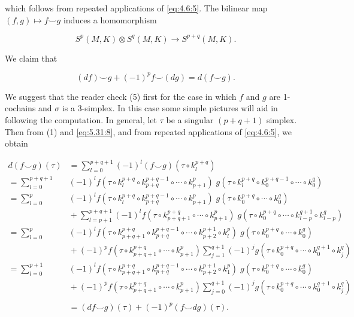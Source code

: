 which follows from repeated applications of \eqref{eq:4.6:5}. The bilinear map  $(f,g)\mapsto f\smallsmile g$ induces a homomorphism

\begin{equation}
\tag{4}\label{eq:5.44:4}
S^{p}(M,K)\otimes S^{q}(M,K)\to S^{p+q}(M,K).
\end{equation}

We claim that

\begin{equation}
\tag{5}\label{eq:5.44:5}
(df)\smallsmile g+(-1)^{p}f\smallsmile(dg)=d(f\smallsmile g).
\end{equation}

We suggest that the reader check (5) first for the case in which $f$ and $g$ are 1-cochains and $\sigma$ is a 3-simplex. In this case some simple pictures will aid in following the computation. In general, let $\tau$ be a singular $(p+q+1)$ simplex. Then from (1) and \eqref{eq:5.31:8}, and from repeated applications of \eqref{eq:4.6:5}, we obtain

\[
\begin{aligned}{d(f\smallsmile g)(\tau)}&{{}=\sum_{l=0}^{p+q+1}(-1)^{l}(f\smallsmile g)(\tau\circ k_{l}^{p+q})}\\ {=\sum_{l=0}^{p+q+1}}&{{}(-1)^{l}f(\tau\circ k_{l}^{p+q}\circ k_{p+q}^{p+q-1}\circ\cdots\circ k_{p+1}^{p})\;g(\tau\circ k_{l}^{p+q}\circ k_{0}^{p+q-1}\circ\cdots\circ k_{0}^{q})}\\ {=\sum_{l=0}^{p}}&{{}(-1)^{l}f(\tau\circ k_{l}^{p+q}\circ k_{p+q}^{p+q-1}\circ\cdots\circ k_{p+1}^{p})\;g(\tau\circ k_{0}^{p+q}\circ\cdots\circ k_{0}^{q})}\\ {}&{{}+\sum_{l=p+1}^{p+q+1}(-1)^{l}f(\tau\circ k_{p+q+1}^{p+q}\circ\cdots\circ k_{p+1}^{p})\;g(\tau\circ k_{0}^{p+q}\circ\cdots\circ k_{l-p}^{q+1}\circ k_{l-p}^{q})}\\ {=\sum_{l=0}^{p}}&{{}(-1)^{l}f(\tau\circ k_{p+q+1}^{p+q}\circ k_{p+q}^{p+q-1}\circ\cdots\circ k_{p+2}^{p+1}\circ k_{l}^{p})\;g(\tau\circ k_{0}^{p+q}\circ\cdots\circ k_{0}^{q})}\\ {}&{{}+(-1)^{p}f(\tau\circ k_{p+q+1}^{p+q}\circ\cdots\circ k_{p+1}^{p})\sum_{j=1}^{q+1}(-1)^{j}g(\tau\circ k_{0}^{p+q}\circ\cdots\circ k_{0}^{q+1}\circ k_{j}^{q})}\\ {=\sum_{l=0}^{p+1}}&{{}(-1)^{l}f(\tau\circ k_{p+q+1}^{p+q}\circ k_{p+q}^{p+q-1}\circ\cdots\circ k_{p+2}^{p+1}\circ k_{1}^{p})\;g(\tau\circ k_{0}^{p+q}\circ\cdots\circ k_{0}^{q})}\\ {}&{{}+(-1)^{p}f(\tau\circ k_{p+q+1}^{p+q}\circ\cdots\circ k_{p+1}^{p})\sum_{j=0}^{q+1}(-1)^{j}g(\tau\circ k_{0}^{p+q}\circ\cdots\circ k_{0}^{q+1}\circ k_{j}^{q})}\\ {}\\ {}&{{}=(d f\smallsmile g)(\tau)+(-1)^{p}(f\smallsmile d g)(\tau).}\\ \end{aligned}
\]

